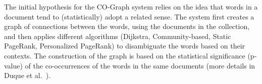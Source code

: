 The initial hypothesis for the CO-Graph system relies on the idea that words in a document tend to (statistically) adopt a related sense. The system first creates a graph of connections between the words, using the documents in the collection, and then applies different algorithms (Dijkstra, Community-based, Static PageRank, Personalized PageRank) to disambiguate the words based on their contexts. The construction of the graph is based on the statistical significance (p-value) of the co-occurrences of the words in the same documents (more details in Duque et al.~). %
